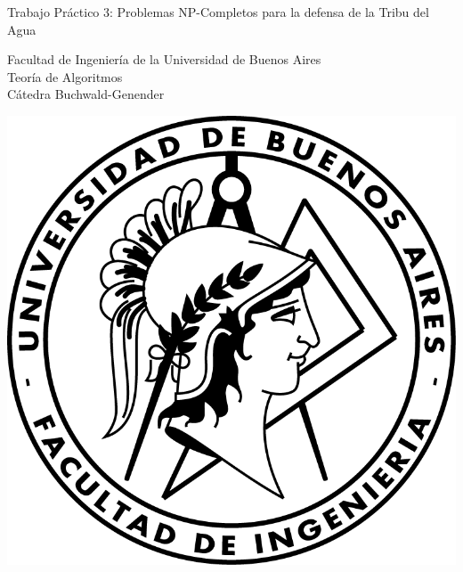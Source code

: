 \documentclass{article}
\begin{document}
\begin{titlepage}
  \vspace*{1cm}

  \begin{center}
    {\Huge{Trabajo Práctico 3: Problemas NP-Completos para la defensa de la Tribu del Agua}}
  \end{center}

  \vspace{0.4cm}

  \begin{center}
    {\LARGE{Facultad de Ingeniería de la Universidad de Buenos Aires}}\\
    \vspace{0.3cm}
    {\Large{Teoría de Algoritmos}}\\
    \vspace{0.3cm}
    {\large{Cátedra Buchwald-Genender}}\\
  \end{center}

  \vspace{0.8cm}
  \begin{center}
    \includegraphics[scale=0.8]{Logo-fiuba}
  \end{center}

  \vspace{1.4cm}
  \begin{center}


\end{center}
\end{titlepage}
\end{document}
